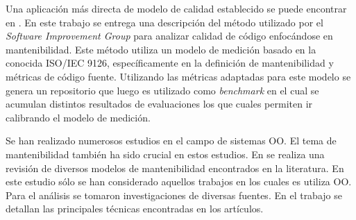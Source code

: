 Una aplicación más directa de modelo de calidad establecido se puede encontrar en
\cite{Baggen:2012}. En este trabajo se entrega una descripción del método utilizado
por el \textit{Software Improvement Group} para analizar calidad de código 
enfocándose en mantenibilidad. Este método utiliza un modelo de medición
basado en la conocida ISO/IEC 9126, específicamente en la definición de mantenibilidad
y métricas de código fuente. Utilizando las métricas adaptadas para este modelo
se genera un repositorio que luego es utilizado como \textit{benchmark} en
el cual se acumulan distintos resultados de evaluaciones los que cuales permiten
ir calibrando el modelo de medición.

Se han realizado numerosos estudios en el campo de sistemas OO. El tema
de mantenibilidad también ha sido crucial en estos estudios. En \cite{Kumar:2011}
se realiza una revisión de diversos modelos de mantenibilidad 
encontrados en la literatura. En este estudio sólo se han considerado
aquellos trabajos en los cuales es utiliza OO. Para el análisis se
tomaron investigaciones de diversas fuentes. En el trabajo se detallan
las principales técnicas encontradas en los artículos.
